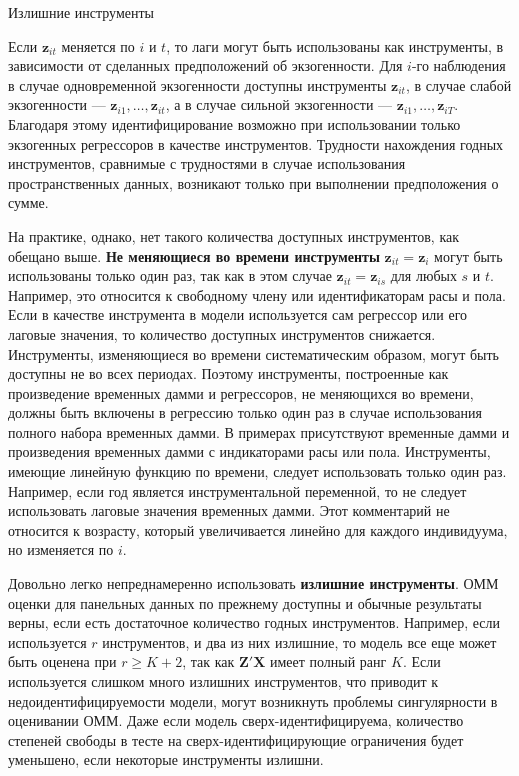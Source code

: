 {\centering  Излишние инструменты}
 
Если $\mathbf z_{it}$ меняется по $i$ и $t$, то лаги могут быть использованы как инструменты, в зависимости от сделанных предположений об экзогенности. Для $i$-го наблюдения в случае одновременной экзогенности доступны инструменты $\mathbf z_{it}$, в случае слабой экзогенности  --- $\mathbf z_{i1}, \dots, \mathbf z_{it}$, а в случае сильной экзогенности --- $\mathbf z_{i1}, \dots, \mathbf z_{iT}$. Благодаря этому идентифицирование возможно при использовании только экзогенных регрессоров в качестве инструментов. Трудности нахождения годных инструментов, сравнимые с трудностями в случае использования пространственных данных, возникают только при выполнении предположения о сумме.

На практике, однако, нет такого количества доступных инструментов, как обещано выше. \textbf{Не меняющиеся во времени инструменты} $\mathbf z_{it}= \mathbf z_{i}$ могут быть использованы только один раз, так как в этом случае $\mathbf z_{it}= \mathbf z_{is}$ для любых $s$ и $t$. Например, это относится к свободному члену или идентификаторам расы и пола. Если в качестве инструмента в модели используется сам регрессор или его лаговые значения, то количество доступных инструментов снижается. Инструменты, изменяющиеся во времени систематическим образом, могут быть доступны не во всех периодах. Поэтому инструменты,  построенные как произведение временных дамми и регрессоров, не меняющихся во времени, должны быть включены в регрессию только один раз в случае использования полного набора временных дамми. В примерах присутствуют временные дамми и произведения временных дамми с индикаторами расы или пола. Инструменты, имеющие линейную функцию по времени, следует использовать только один раз. Например,  если год является инструментальной переменной, то не следует использовать лаговые значения временных дамми. Этот комментарий не относится к возрасту, который увеличивается линейно для каждого индивидуума, но изменяется по $i$.

Довольно легко непреднамеренно использовать \textbf{излишние инструменты}. ОММ оценки для панельных данных по прежнему доступны и обычные результаты верны, если  есть достаточное количество годных инструментов. Например, если используется $r$ инструментов, и два из них излишние, то модель все еще может быть оценена при $r \geq K +2$, так как $\mathbf Z' \mathbf X$ имеет полный ранг $K$. Если используется слишком много излишних инструментов, что приводит к недоидентифицируемости модели, могут возникнуть проблемы сингулярности в оценивании ОММ. Даже если модель сверх-идентифицируема, количество степеней свободы в тесте на сверх-идентифицирующие ограничения будет уменьшено, если некоторые инструменты излишни.

